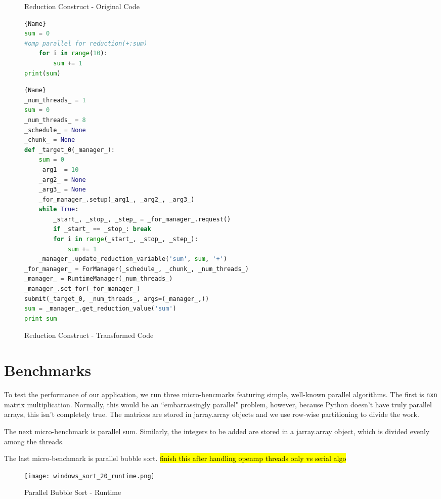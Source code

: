 \documentclass[letterpaper,12pt]{article} %
\begin{document}
\begin{figure}[H]
\caption{Reduction Construct - Original Code}
\label{fig:reduction1}
\begin{lstlisting}[language=Python]{Name}
sum = 0
#omp parallel for reduction(+:sum)
    for i in range(10):
        sum += 1
print(sum)
\end{lstlisting}

\caption{Reduction Construct - Transformed Code}
\label{fig:reduction2}
\begin{lstlisting}[language=Python]{Name}
_num_threads_ = 1
sum = 0
_num_threads_ = 8
_schedule_ = None
_chunk_ = None
def _target_0(_manager_):
    sum = 0
    _arg1_ = 10
    _arg2_ = None
    _arg3_ = None
    _for_manager_.setup(_arg1_, _arg2_, _arg3_)
    while True:
        _start_, _stop_, _step_ = _for_manager_.request()
        if _start_ == _stop_: break
        for i in range(_start_, _stop_, _step_):
            sum += 1
    _manager_.update_reduction_variable('sum', sum, '+')
_for_manager_ = ForManager(_schedule_, _chunk_, _num_threads_)
_manager_ = RuntimeManager(_num_threads_)
_manager_.set_for(_for_manager_)
submit(_target_0, _num_threads_, args=(_manager_,))
sum = _manager_.get_reduction_value('sum')
print sum
\end{lstlisting}
\end{figure}



\section{Benchmarks}
To test the performance of our application, we run three micro-bencmarks featuring simple, well-known parallel algorithms. The first is \texttt{nxn} matrix multiplication. Normally, this would be an ``embarrassingly parallel" problem, however, because Python doesn't have truly parallel arrays, this isn't completely true. The matrices are stored in jarray.array objects and we use row-wise partitioning to divide the work.

The next micro-benchmark is parallel sum. Similarly, the integers to be added are stored in a jarray.array object, which is divided evenly among the threads. 

The last micro-benchmark is parallel bubble sort. \hl{finish this after handling openmp threads only vs serial algo}



\begin{figure} [H]
    \centering
          {\texttt{[image: windows\_sort\_20\_runtime.png]}}
        \caption{Parallel Bubble Sort - Runtime}
        \label{fig:arch_flow}
    \centering
\end{figure}
\end{document}
